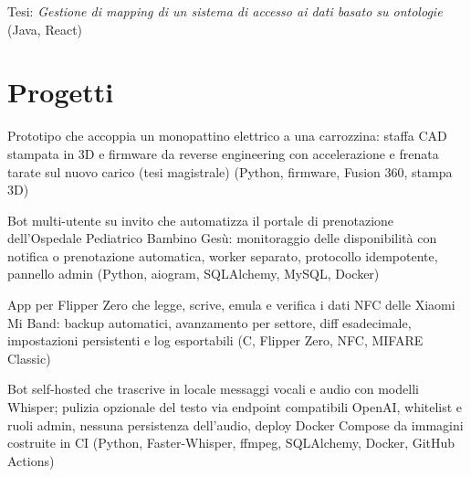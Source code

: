 \documentclass[a4paper,10pt]{article}
\begin{document}
\begin{cvitems}
  \item Tesi: \textit{Gestione di mapping di un sistema di accesso ai dati basato su ontologie} (Java, React)
\end{cvitems}


\section{Progetti}

\begin{cvitems}
  \item Prototipo che accoppia un monopattino elettrico a una carrozzina: staffa CAD stampata in 3D e firmware da reverse engineering con accelerazione e frenata tarate sul nuovo carico (tesi magistrale) (Python, firmware, Fusion 360, stampa 3D)
\end{cvitems}

\begin{cvitems}
  \item Bot multi-utente su invito che automatizza il portale di prenotazione dell'Ospedale Pediatrico Bambino Gesù: monitoraggio delle disponibilità con notifica o prenotazione automatica, worker separato, protocollo idempotente, pannello admin (Python, aiogram, SQLAlchemy, MySQL, Docker)
\end{cvitems}

\begin{cvitems}
  \item App per Flipper Zero che legge, scrive, emula e verifica i dati NFC delle Xiaomi Mi Band: backup automatici, avanzamento per settore, diff esadecimale, impostazioni persistenti e log esportabili (C, Flipper Zero, NFC, MIFARE Classic)
\end{cvitems}

\begin{cvitems}
  \item Bot self-hosted che trascrive in locale messaggi vocali e audio con modelli Whisper; pulizia opzionale del testo via endpoint compatibili OpenAI, whitelist e ruoli admin, nessuna persistenza dell'audio, deploy Docker Compose da immagini costruite in CI (Python, Faster-Whisper, ffmpeg, SQLAlchemy, Docker, GitHub Actions)
\end{cvitems}
\end{document}
